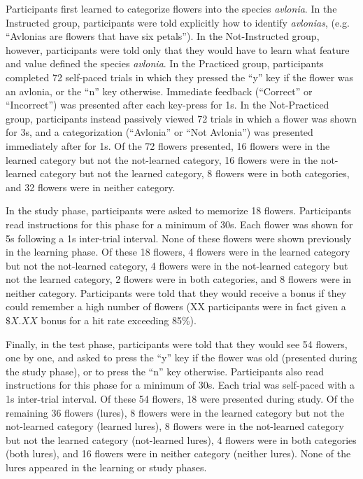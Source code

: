 \documentclass[twocolumn]{svjour3}          %
\begin{document}
Participants first learned to categorize flowers into the species
\emph{avlonia}. In the Instructed group, participants were told
explicitly how to identify \emph{avlonias}, (e.g. ``Avlonias are
flowers that have six petals''). In the Not-Instructed group, however,
participants were told only that they would have to learn what feature
and value defined the species \emph{avlonia}. In the Practiced group,
participants completed 72 self-paced trials in which they pressed the
``y'' key if the flower was an avlonia, or the ``n'' key
otherwise. Immediate feedback (``Correct'' or ``Incorrect'') was
presented after each key-press for 1s. In the Not-Practiced group,
participants instead passively viewed 72 trials in which a flower was
shown for 3s, and a categorization (``Avlonia'' or ``Not Avlonia'')
was presented immediately after for 1s. Of the 72 flowers presented,
16 flowers were in the learned category but not the not-learned
category, 16 flowers were in the not-learned category but not the
learned category, 8 flowers were in both categories, and 32 flowers
were in neither category.

In the study phase, participants were asked to memorize 18
flowers. Participants read instructions for this phase for a minimum
of 30s.  Each flower was shown for 5s following a 1s inter-trial
interval. None of these flowers were shown previously in the learning
phase. Of these 18 flowers, 4 flowers were in the learned category but
not the not-learned category, 4 flowers were in the not-learned
category but not the learned category, 2 flowers were in both
categories, and 8 flowers were in neither category. Participants were
told that they would receive a bonus if they could remember a high
number of flowers (XX participants were in fact given a $\$X.XX$ bonus
for a hit rate exceeding 85\%).

Finally, in the test phase, participants were told that they would see
54 flowers, one by one, and asked to press the ``y'' key if the flower
was old (presented during the study phase), or to press the ``n'' key
otherwise. Participants also read instructions for this phase for a
minimum of 30s. Each trial was self-paced with a 1s inter-trial
interval. Of these 54 flowers, 18 were presented during study. Of the
remaining 36 flowers (lures), 8 flowers were in the learned category
but not the not-learned category (learned lures), 8 flowers were in
the not-learned category but not the learned category (not-learned
lures), 4 flowers were in both categories (both lures), and 16 flowers
were in neither category (neither lures). None of the lures appeared
in the learning or study phases.
\end{document}
